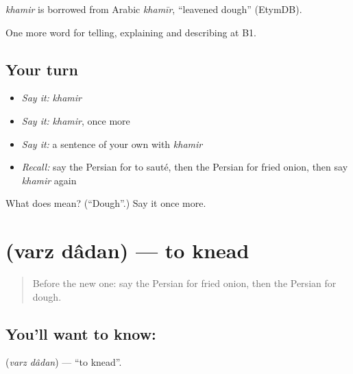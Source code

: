\begin{cousinweb}
\emph{khamir} is borrowed from Arabic \emph{khamīr}, \textquotedblleft{}leavened dough\textquotedblright{} (EtymDB).
\end{cousinweb}

\begin{grammarlens}[title={What you've built}]
One more word for telling, explaining and describing at B1.
\end{grammarlens}

\subsection*{Your turn}
\begin{itemize}
\raggedright
  \item \emph{Say it:} \emph{khamir}
  \item \emph{Say it:} \emph{khamir}, once more
  \item \emph{Say it:} a sentence of your own with \emph{khamir}
  \item \emph{Recall:} say the Persian for to sauté, then the Persian for fried onion, then say \emph{khamir} again
\end{itemize}

\begin{tcolorbox}[breakable,colback=teal!4,colframe=teal!35!black,title={Before you move on}]
What does  mean? (\textquotedblleft{}Dough\textquotedblright{}.) Say it once more.
\end{tcolorbox}
\section[\texorpdfstring{\fa{ورز} \fa{دادن} (varz dâdan)}{ورز دادن (varz dâdan)}]{  (varz dâdan) — to knead}

\label{lesson:FA-C357-varz-dadan}



\begin{quote}
Before the new one: say the Persian for fried onion, then the Persian for dough.
\end{quote}

\subsection*{You'll want to know:  }
\textbf{ } (\emph{varz dâdan}) — \textquotedblleft{}to knead\textquotedblright{}.


